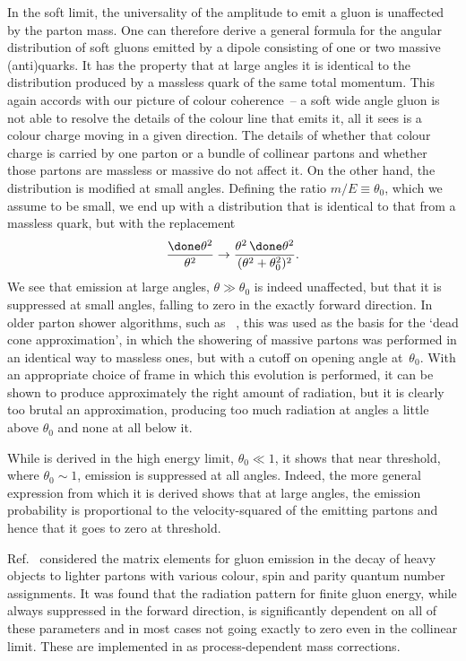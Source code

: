 In the soft limit, the universality of the amplitude to emit a gluon is
unaffected by the parton mass.  One can therefore derive a general
formula for the angular distribution of soft gluons emitted by a dipole
consisting of one or two massive (anti)quarks.  It has the property that
at large angles it is identical to the distribution produced by a
massless quark of the same total momentum.  This again accords with our
picture of colour coherence~-- a soft wide angle gluon is not able to
resolve the details of the colour line that emits it, all it sees is a
colour charge moving in a given direction.  The details of whether that
colour charge is carried by one parton or a bundle of collinear partons
and whether those partons are massless or massive do not affect it.  On
the other hand, the distribution is modified at small angles.  Defining
the ratio $m/E\equiv\theta_0$, which we assume to be small, we end up
with a distribution that is identical to that from a massless quark, but
with the replacement
\begin{equation}
  \label{eq:deadcone}
  \frac{\done\theta^2}{\theta^2} \rightarrow
  \frac{\theta^2\,\done\theta^2}{(\theta^2+\theta_0^2)^2}.
\end{equation}
We see that emission at large angles, $\theta\gg\theta_0$ is indeed
unaffected, but that it is suppressed at small angles, falling to zero
in the exactly forward direction.  In older parton shower algorithms,
such as \Herwig\ \cite{Marchesini:1989yk}, this was used as the basis for the
`dead cone approximation', in which the showering of massive partons was
performed in an identical way to massless ones, but with a cutoff on
opening angle at~$\theta_0$.  With an appropriate choice of frame in
which this evolution is performed, it can be shown to produce
approximately the right amount of radiation, but it is clearly too
brutal an approximation, producing too much radiation at angles a little
above $\theta_0$ and none at all below it.

While  is derived in the high energy limit,
$\theta_0\ll1$, it shows that near threshold, where $\theta_0\sim1$,
emission is suppressed at all angles.  Indeed, the more general
expression from which it is derived shows that at large angles, the
emission probability is proportional to the velocity-squared of the
emitting partons and hence that it goes to zero at threshold.

Ref.~\cite{Norrbin:2000uu} considered the matrix elements for gluon
emission in the decay of heavy objects to lighter partons with various
colour, spin and parity quantum number assignments.  It was found that the
radiation pattern for finite gluon energy, while always suppressed in
the forward direction, is significantly dependent on all of these
parameters and in most cases not going exactly to zero even in the
collinear limit.  These are implemented in \Pythia as process-dependent
mass corrections.

